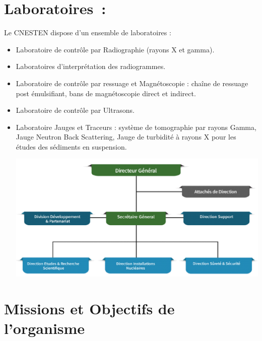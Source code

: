 \documentclass{report}
\newenvironment{mystyle}{
	\setlength{\parindent}{0pt} %
	\setlength{\parskip}{10pt} %
	\fontsize{12pt}{14pt}\selectfont %
}{
}
\begin{document}
		\section{Laboratoires :}
	
	\begin{mystyle}
		Le CNESTEN dispose d’un ensemble de laboratoires :
		\begin{itemize}
			\item Laboratoire de contrôle par Radiographie (rayons X et gamma).
			
			\item Laboratoires d’interprétation des radiogrammes.
			\item Laboratoire de contrôle par ressuage et Magnétoscopie : chaîne de ressuage post émulsifiant, bans de magnétoscopie direct et indirect.
			\item Laboratoire de contrôle par Ultrasons.
			\item Laboratoire Jauges et Traceurs : système de tomographie par rayons Gamma, Jauge Neutron Back Scattering, Jauge de turbidité à rayons X pour les études des sédiments en suspension.
			\begin{center} %
				\includegraphics[width=1\textwidth]{organisme.png} 
			\end{center}
		\end{itemize}
	\end{mystyle}
	
	
			\section{Missions et Objectifs de l’organisme}
	
\end{document}
